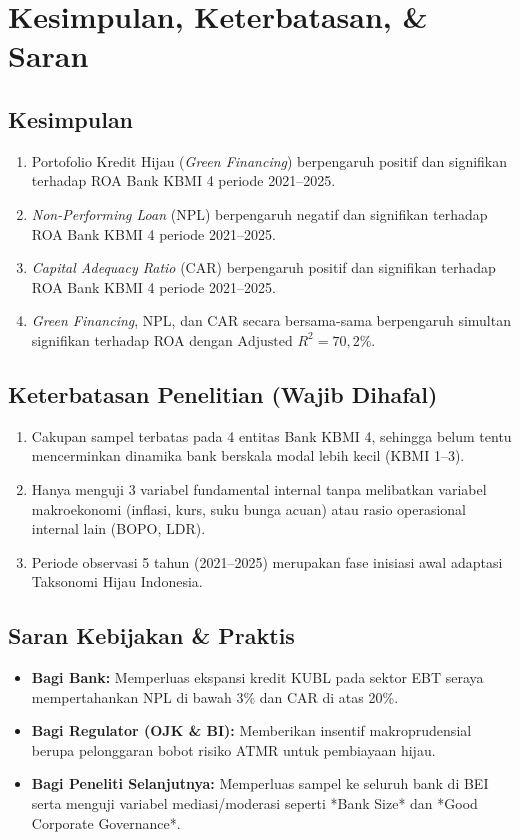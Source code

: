 \documentclass[11pt,a4paper]{article}
\begin{document}
\section{Kesimpulan, Keterbatasan, \& Saran}

\subsection{Kesimpulan}
\begin{enumerate}
    \item Portofolio Kredit Hijau (\textit{Green Financing}) berpengaruh positif dan signifikan terhadap ROA Bank KBMI 4 periode 2021--2025.
    \item \textit{Non-Performing Loan} (NPL) berpengaruh negatif dan signifikan terhadap ROA Bank KBMI 4 periode 2021--2025.
    \item \textit{Capital Adequacy Ratio} (CAR) berpengaruh positif dan signifikan terhadap ROA Bank KBMI 4 periode 2021--2025.
    \item \textit{Green Financing}, NPL, dan CAR secara bersama-sama berpengaruh simultan signifikan terhadap ROA dengan $\text{Adjusted } R^2 = 70{,}2\%$.
\end{enumerate}

\subsection{Keterbatasan Penelitian (Wajib Dihafal)}
\begin{enumerate}
    \item Cakupan sampel terbatas pada 4 entitas Bank KBMI 4, sehingga belum tentu mencerminkan dinamika bank berskala modal lebih kecil (KBMI 1--3).
    \item Hanya menguji 3 variabel fundamental internal tanpa melibatkan variabel makroekonomi (inflasi, kurs, suku bunga acuan) atau rasio operasional internal lain (BOPO, LDR).
    \item Periode observasi 5 tahun (2021--2025) merupakan fase inisiasi awal adaptasi Taksonomi Hijau Indonesia.
\end{enumerate}

\subsection{Saran Kebijakan \& Praktis}
\begin{itemize}
    \item \textbf{Bagi Bank:} Memperluas ekspansi kredit KUBL pada sektor EBT seraya mempertahankan NPL di bawah 3\% dan CAR di atas 20\%.
    \item \textbf{Bagi Regulator (OJK \& BI):} Memberikan insentif makroprudensial berupa pelonggaran bobot risiko ATMR untuk pembiayaan hijau.
    \item \textbf{Bagi Peneliti Selanjutnya:} Memperluas sampel ke seluruh bank di BEI serta menguji variabel mediasi/moderasi seperti *Bank Size* dan *Good Corporate Governance*.
\end{itemize}
\end{document}
